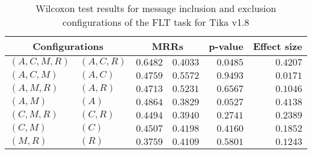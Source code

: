 
\begin{table}
\begin{spacing}{1.2}
\centering
\caption{Wilcoxon test results for message inclusion and exclusion configurations of the FLT task for Tika v1.8}
\label{table:versus-wilcox-tika-flt-message}
\begin{tabular}{ll|rr|rr}
\toprule
      \multicolumn{2}{c|}{Configurations} &          \multicolumn{2}{c|}{MRRs} &       p-value & Effect size \\
\midrule
 $(A,C,M,R)$ &  $(A,C,R)$ & $0.6482$ & $0.4033$ & $0.0485$ &    $0.4207$ \\
   $(A,C,M)$ &    $(A,C)$ & $0.4759$ & $0.5572$ & $0.9493$ &    $0.0171$ \\
   $(A,M,R)$ &    $(A,R)$ & $0.4713$ & $0.5231$ & $0.6567$ &    $0.1046$ \\
     $(A,M)$ &      $(A)$ & $0.4864$ & $0.3829$ & $0.0527$ &    $0.4138$ \\
   $(C,M,R)$ &    $(C,R)$ & $0.4494$ & $0.3940$ & $0.2741$ &    $0.2389$ \\
     $(C,M)$ &      $(C)$ & $0.4507$ & $0.4198$ & $0.4160$ &    $0.1852$ \\
     $(M,R)$ &      $(R)$ & $0.3759$ & $0.4109$ & $0.5801$ &    $0.1243$ \\
\bottomrule
\end{tabular}

\end{spacing}
\end{table}


